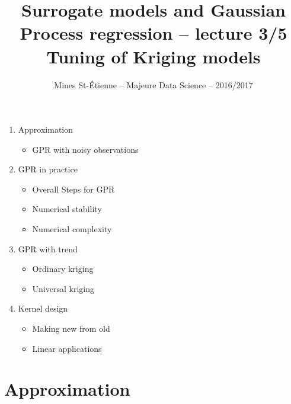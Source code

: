 \documentclass{beamer}
\title[Majeure Data Science -- Surrogate models and GPR]{\texorpdfstring{ \small Surrogate models and Gaussian Process regression -- lecture 3/5 \\ \vspace{3mm} \LARGE Tuning of Kriging models}{}}
\author[Mines St-\'Etienne ]{Mines St-\'Etienne -- Majeure Data Science -- 2016/2017}
\institute{\texorpdfstring{Nicolas Durrande (durrande@emse.fr)}{}}
\date{\null}
\begin{document}
\begin{frame}
  \titlepage
\end{frame}

\begin{frame}{}
\vspace{0.75cm}
\vspace{0.3cm}
\begin{enumerate}
    \item Approximation
    \begin{itemize}
    	\item GPR with noisy observations  \vspace{2mm}
    \end{itemize}
    \item GPR in practice
        \begin{itemize}
    		\item Overall Steps for GPR
    		\item Numerical stability
    		\item Numerical complexity  \vspace{2mm}
    	\end{itemize}
    \item GPR with trend
    	\begin{itemize}
    		\item Ordinary kriging
    		\item Universal kriging \vspace{2mm}
    	\end{itemize}
    \item Kernel design
    	\begin{itemize}
    		\item Making new from old
    		\item Linear applications
    	\end{itemize}
\end{enumerate}
\end{frame}


\section{Approximation}
\subsection{}
\end{document}
